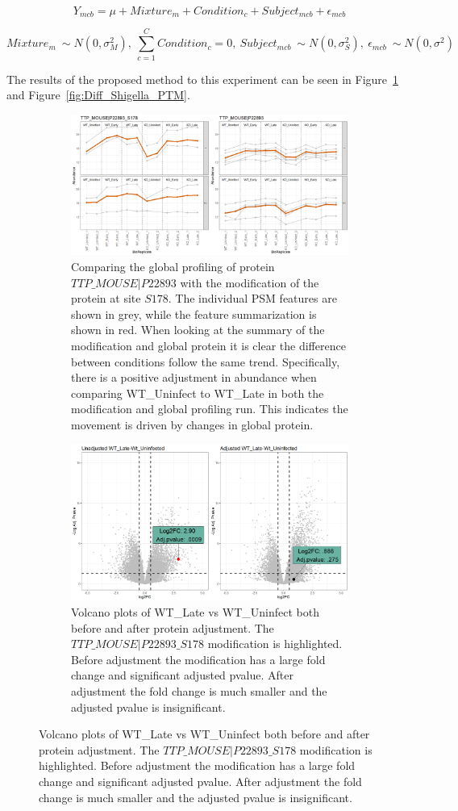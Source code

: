 \documentclass{mcp}
\def\sfigref#1{{Figure~\ref{#1}}}
\begin{document}
$$Y_{mcb} = \mu + Mixture_m + Condition_c + Subject_{mcb} + \epsilon_{mcb}$$

$$Mixture_m ~ \sim N(0, \sigma^2_M) ,\: \sum_{c=1}^C{Condition_c} = 0 ,\: Subject_{mcb} ~ \sim N(0, \sigma^2_S) ,\: \epsilon_{mcb} ~ \sim N(0, \sigma^2)$$

The results of the proposed method to this experiment can be seen in \sfigref{fig:No_Diff_Shigella_PTM} and \sfigref{fig:Diff_Shigella_PTM}.


\begin{figure}[h!]
\centering
 \begin{subfigure}{\textwidth}
	\includegraphics[width=\textwidth]{sim_new/No_Difference_Shigella_Profile_Plot}
	\caption{Comparing the global profiling of protein $TTP\_MOUSE|P22893$ with the modification of the protein at site $S178$. The individual PSM features are shown in grey, while the feature summarization is shown in red. When looking at the summary of the modification and global protein it is clear the difference between conditions follow the same trend. Specifically, there is a positive adjustment in abundance when comparing WT\_Uninfect to WT\_Late in both the modification and global profiling run. This indicates the movement is driven by changes in global protein.}
 \end{subfigure}
 \begin{subfigure}{\textwidth}
	\includegraphics[width=\textwidth]{sim_new/No_Difference_Shigella_Volcano}
	\caption{Volcano plots of WT\_Late vs WT\_Uninfect both before and after protein adjustment. The $TTP\_MOUSE|P22893\_S178$ modification is highlighted. Before adjustment the modification has a large fold change and significant adjusted pvalue. After adjustment the fold change is much smaller and the adjusted pvalue is insignificant.}
 \end{subfigure}
\label{fig:No_Diff_Shigella_PTM}
\end{figure}
\end{document}
